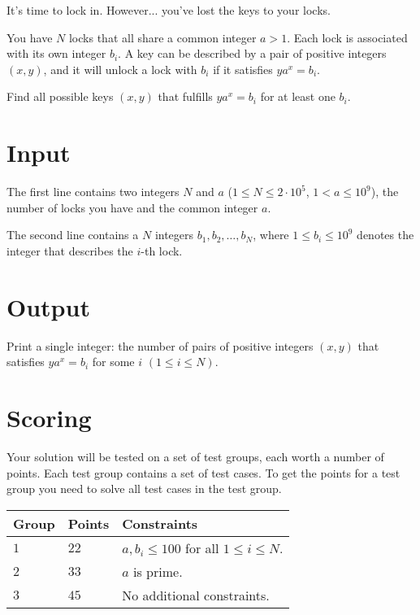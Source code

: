 
It's time to lock in. However... you've lost the keys to your locks.

You have $N$ locks that all share a common integer $a > 1$. Each lock is associated with its own integer $b_i$.
A key can be described by a pair of positive integers $(x,y)$, and it will unlock a lock with $b_i$ if it satisfies $ya^x = b_i$.

Find all possible keys $(x,y)$ that fulfills $ya^x = b_i$ for at least one $b_i$.

\section*{Input}
The first line contains two integers $N$ and $a$ ($1 \leq N \leq 2 \cdot 10^5$, $1 < a \leq 10^9$), the number of locks you have and the common integer $a$.

The second line contains a $N$ integers $b_1, b_2, \dots, b_N$, where $1 \leq b_i \leq 10^9$ denotes the integer that describes the $i$-th lock.

\section*{Output}
Print a single integer: the number of pairs of positive integers $(x,y)$ that satisfies $ya^x = b_i$ for some $i$ $(1\leq i \leq N)$.

\section*{Scoring}
Your solution will be tested on a set of test groups, each worth a number of points. Each test group contains
a set of test cases. To get the points for a test group you need to solve all test cases in the test group.

\noindent
\begin{tabular}{| l | l | p{12cm} |}
  \hline
  \textbf{Group} & \textbf{Points} & \textbf{Constraints} \\ \hline
  $1$    & $22$       & $a, b_i \leq 100$ for all $1 \leq i \leq N$. \\ \hline
  $2$    & $33$       & $a$ is prime. \\ \hline
  $3$    & $45$       & No additional constraints. \\ \hline
\end{tabular}

